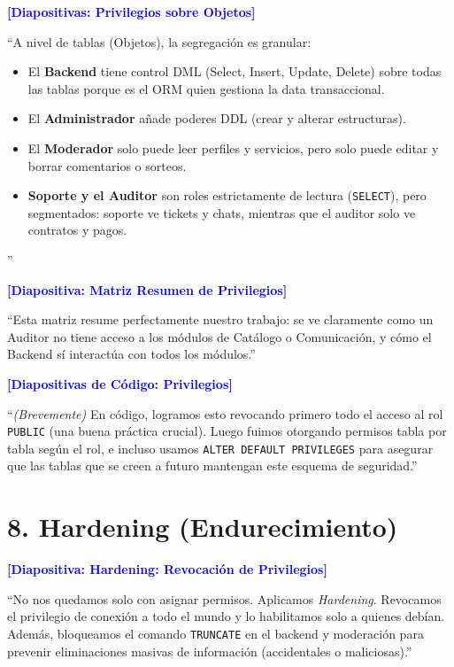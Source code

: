 \documentclass[12pt, a4paper]{article}
\begin{document}
\vspace{0.5cm}
\textbf{\textcolor{blue}{[Diapositivas: Privilegios sobre Objetos]}}

``A nivel de tablas (Objetos), la segregación es granular:
\begin{itemize}
    \item El \textbf{Backend} tiene control DML (Select, Insert, Update, Delete) sobre todas las tablas porque es el ORM quien gestiona la data transaccional.
    \item El \textbf{Administrador} añade poderes DDL (crear y alterar estructuras).
    \item El \textbf{Moderador} solo puede leer perfiles y servicios, pero solo puede editar y borrar comentarios o sorteos.
    \item \textbf{Soporte y el Auditor} son roles estrictamente de lectura (\texttt{SELECT}), pero segmentados: soporte ve tickets y chats, mientras que el auditor solo ve contratos y pagos.
\end{itemize}''

\vspace{0.5cm}
\textbf{\textcolor{blue}{[Diapositiva: Matriz Resumen de Privilegios]}}

``Esta matriz resume perfectamente nuestro trabajo: se ve claramente como un Auditor no tiene acceso a los módulos de Catálogo o Comunicación, y cómo el Backend sí interactúa con todos los módulos.''

\vspace{0.5cm}
\textbf{\textcolor{blue}{[Diapositivas de Código: Privilegios]}}

``\textit{(Brevemente)} En código, logramos esto revocando primero todo el acceso al rol \texttt{PUBLIC} (una buena práctica crucial). Luego fuimos otorgando permisos tabla por tabla según el rol, e incluso usamos \texttt{ALTER DEFAULT PRIVILEGES} para asegurar que las tablas que se creen a futuro mantengan este esquema de seguridad.''

\section*{8. Hardening (Endurecimiento)}
\textbf{\textcolor{blue}{[Diapositiva: Hardening: Revocación de Privilegios]}}

``No nos quedamos solo con asignar permisos. Aplicamos \textit{Hardening}. Revocamos el privilegio de conexión a todo el mundo y lo habilitamos solo a quienes debían. Además, bloqueamos el comando \texttt{TRUNCATE} en el backend y moderación para prevenir eliminaciones masivas de información (accidentales o maliciosas).''
\end{document}
